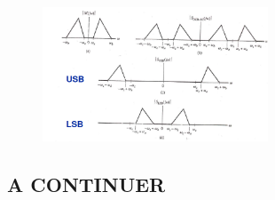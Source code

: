 						
			\begin{figure}[htp]
			\centering
			\includegraphics[width=0.6\textwidth]{img/BandeLateralUnique.png}
		\end{figure}
		
	\subsection{A CONTINUER}